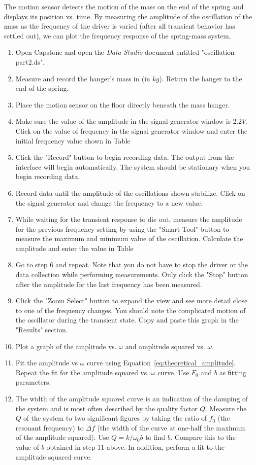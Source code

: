 \documentclass[twocolumn,english]{IEEEtran}
\theoremstyle{plain}
\theoremstyle{plain}
\begin{document}
 The motion sensor detects the motion of the mass on the end of the spring and displays its position vs. time.
 By measuring the amplitude of the oscillation of the mass as the frequency of the driver is varied (after all transient behavior has settled out), we can plot the frequency response of the spring-mass system.
\begin{enumerate}
\item
 Open Capstone and open the \textit{Data Studio} document entitled "oscillation part2.ds".
\item
 Measure and record the hanger's mass in (in $kg$). Return the hanger to the end of the spring.
\item
 Place the motion sensor on the floor directly beneath the mass hanger.
\item
 Make sure the value of the amplitude in the signal generator window is $2.2 V$. Click on the value of frequency in the signal generator window and enter the initial frequency value shown in Table %
\item Click the "Record" button to begin recording data. The output from the interface will begin automatically. The system should be stationary when you begin recording data.
\item
 Record data until the amplitude of the oscillations shown stabilize. Click on the signal generator and change the frequency to a new value.
\item
 While waiting for the transient response to die out, measure the amplitude for the previous frequency setting by using the "Smart Tool" button to measure the maximum and minimum value of the oscillation. Calculate the amplitude and enter the value in Table %
\item
 Go to step 6 and repeat. Note that you do not have to stop the driver or the data collection while performing measurements. Only click the "Stop" button after the amplitude for the last frequency has been measured.
\item
 Click the "Zoom Select" button to expand the view and see more detail close to one of the frequency changes. You should note the complicated motion of the oscillator during the transient state. Copy and paste this graph in the "Results" section.
\item
 Plot a graph of the amplitude vs. $\omega$ and amplitude squared vs. $\omega$.
\item
 Fit the amplitude vs $\omega$ curve using Equation~\ref{eq:theoretical_amplitude}. Repeat the fit for the amplitude squared vs. $\omega$ curve. Use $F_0$ and $b$ as fitting parameters.
\item
 The width of the amplitude squared curve is an indication of the damping of the system and is most often described by the quality factor $Q$. Measure the $Q$ of the system to two significant figures by taking the ratio of $f_0$ (the resonant frequency) to $\Delta f$ (the width of the curve at one-half the maximum of the amplitude squared). Use $Q=k/\omega_0 b$ to find $b$. Compare this to the value of $b$ obtained in step 11 above. In addition, perform a fit to the amplitude squared curve.
\end{enumerate}
\end{document}
